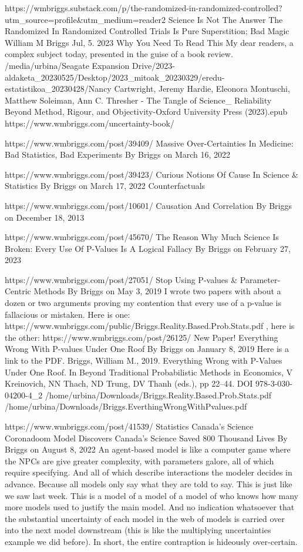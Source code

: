 

https://wmbriggs.substack.com/p/the-randomized-in-randomized-controlled?utm_source=profile&utm_medium=reader2
Science Is Not The Answer
The Randomized In Randomized Controlled Trials Is Pure Superstition; Bad Magic
William M Briggs
Jul, 5. 2023
Why You Need To Read This
My dear readers, a complex subject today, presented in the guise of a book review.
/media/urbina/Seagate Expansion Drive/2023-aldaketa_20230525/Desktop/2023_mitoak_20230329/eredu-estatistikoa_20230428/Nancy Cartwright, Jeremy Hardie, Eleonora Montuschi, Matthew Soleiman, Ann C. Thresher - The Tangle of Science_ Reliability Beyond Method, Rigour, and Objectivity-Oxford University Press (2023).epub
https://www.wmbriggs.com/uncertainty-book/

https://www.wmbriggs.com/post/39409/
Massive Over-Certainties In Medicine: Bad Statistics, Bad Experiments
By Briggs on March 16, 2022	

https://www.wmbriggs.com/post/39423/
Curious Notions Of Cause In Science & Statistics
By Briggs on March 17, 2022
Counterfactuals

https://www.wmbriggs.com/post/10601/
Causation And Correlation
By Briggs on December 18, 2013

https://www.wmbriggs.com/post/45670/
The Reason Why Much Science Is Broken: Every Use Of P-Values Is A Logical Fallacy
By Briggs on February 27, 2023

https://www.wmbriggs.com/post/27051/
Stop Using P-values & Parameter-Centric Methods
By Briggs on May 3, 2019
I wrote two papers with about a dozen or two arguments proving my contention that every use of a p-value is fallacious or mistaken.
Here is one: https://www.wmbriggs.com/public/Briggs.Reality.Based.Prob.Stats.pdf
, here is the other: 
https://www.wmbriggs.com/post/26125/
New Paper! Everything Wrong With P-values Under One Roof
By Briggs on January 8, 2019
Here is a link to the PDF.
Briggs, William M., 2019. Everything Wrong with P-Values Under One Roof. In Beyond Traditional Probabilistic Methods in Economics, V Kreinovich, NN Thach, ND Trung, DV Thanh (eds.), pp 22–44. DOI 978-3-030-04200-4_2
/home/urbina/Downloads/Briggs.Reality.Based.Prob.Stats.pdf
/home/urbina/Downloads/Briggs.EverthingWrongWithPvalues.pdf

https://www.wmbriggs.com/post/41539/
Statistics
Canada’s Science Coronadoom Model Discovers Canada’s Science Saved 800 Thousand Lives
By Briggs on August 8, 2022	
An agent-based model is like a computer game where the NPCs are give greater complexity, with parameters galore, all of which require specifying. And all of which describe interactions the modeler decides in advance. Because all models only say what they are told to say.
This is just like we saw last week. This is a model of a model of a model of who knows how many more models used to justify the main model. And no indication whatsoever that the substantial uncertainty of each model in the web of models is carried over into the next model downstream (this is like the multiplying uncertainties example we did before). In short, the entire contraption is hideously over-certain.





